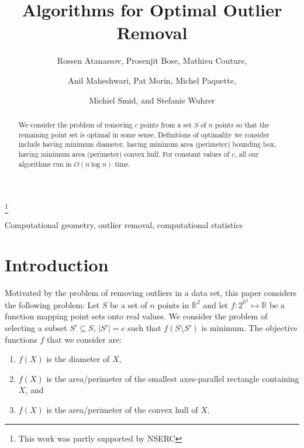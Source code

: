 \documentclass{elsart}
\begin{document}
\begin{frontmatter}

\title{Algorithms for Optimal Outlier Removal}

\author{Rossen Atanassov,
	Prosenjit Bose,
	Mathieu Couture,}
\author{
	Anil Maheshwari,
	Pat Morin,
	Michel Paquette,}
\author{Michiel Smid, and
	Stefanie Wuhrer}

\address{School of Computer Science, Carleton University \\
	1125 Colonel By Drive, Ottawa, CANADA K1S~5B6}
\thanks[funding]{This work was partly supported by NSERC}

\begin{abstract}
We consider the problem of removing $c$ points from a set $S$ of $n$
points so that the remaining point set is optimal in some sense.
Definitions of optimality we consider include having minimum diameter,
having minimum area (perimeter) bounding box, having minimum area
(perimeter) convex hull.  For constant values of $c$, all our
algorithms run in $O(n\log n)$ time.
\end{abstract}

\begin{keyword}
Computational geometry, outlier removal, computational statistics
\end{keyword}

\end{frontmatter}

\section{Introduction}

Motivated by the problem of removing outliers in a data set, this
paper considers the following problem: Let $S$ be a set of $n$ points
in $\mathbb{R}^2$ and let $f:2^{\mathbb{R}^2}\mapsto \mathbb{R}$ be a
function mapping point sets onto real values.  We consider the problem
of selecting a subset $S'\subseteq S$, $|S'|=c$ such that
$f(S\setminus S')$ is minimum.  The objective functions $f$ that we
consider are:
\begin{enumerate}
\item $f(X)$ is the diameter of $X$,
\item $f(X)$ is the area/perimeter of the smallest axes-parallel
rectangle containing $X$, and
\item $f(X)$ is the area/perimeter of the convex hull of $X$.
\end{enumerate}  
\end{document}
